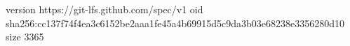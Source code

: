 version https://git-lfs.github.com/spec/v1
oid sha256:cc137f74f4ea3c6152be2aaa1fe45a4b69915d5c9da3b03e68238e3356280d10
size 3365
